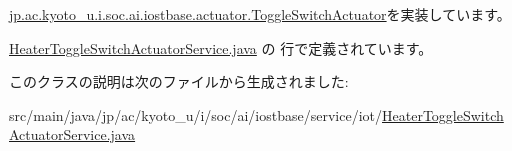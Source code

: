 \hyperlink{interfacejp_1_1ac_1_1kyoto__u_1_1i_1_1soc_1_1ai_1_1iostbase_1_1actuator_1_1_toggle_switch_actuator_acb2ed89477ba7892898d1783ab038e94}{jp.\-ac.\-kyoto\-\_\-u.\-i.\-soc.\-ai.\-iostbase.\-actuator.\-Toggle\-Switch\-Actuator}を実装しています。



 \hyperlink{_heater_toggle_switch_actuator_service_8java_source}{Heater\-Toggle\-Switch\-Actuator\-Service.\-java} の  行で定義されています。



このクラスの説明は次のファイルから生成されました\-:\begin{DoxyCompactItemize}
\item 
src/main/java/jp/ac/kyoto\-\_\-u/i/soc/ai/iostbase/service/iot/\hyperlink{_heater_toggle_switch_actuator_service_8java}{Heater\-Toggle\-Switch\-Actuator\-Service.\-java}\end{DoxyCompactItemize}
